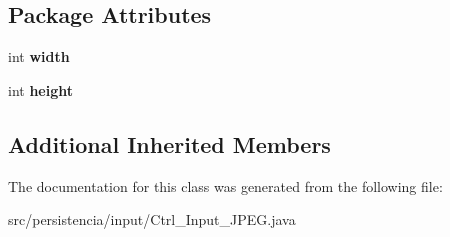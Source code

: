 \subsection*{Package Attributes}
\begin{DoxyCompactItemize}
\item 
\mbox{\label{classpersistencia_1_1input_1_1Ctrl__Input__JPEG_a07d902b25b54941dc0444398c7d380e7}} 
int {\bfseries width}
\item 
\mbox{\label{classpersistencia_1_1input_1_1Ctrl__Input__JPEG_a9e6805b998e58981f8cd7b8b6e609f27}} 
int {\bfseries height}
\end{DoxyCompactItemize}
\subsection*{Additional Inherited Members}


The documentation for this class was generated from the following file\+:\begin{DoxyCompactItemize}
\item 
src/persistencia/input/Ctrl\+\_\+\+Input\+\_\+\+J\+P\+E\+G.\+java\end{DoxyCompactItemize}
